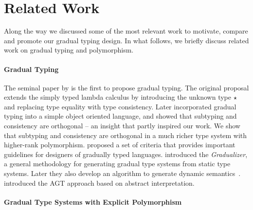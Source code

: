 
\section{Related Work}
\label{sec:related}

Along the way we discussed some of the most relevant work to motivate,
compare and
promote our gradual typing design. In what follows, we briefly discuss related
work on gradual typing and polymorphism.


\paragraph{Gradual Typing}

The seminal paper by \citet{siek2006gradual} is the first to propose gradual
typing.
The original proposal extends the simply typed lambda calculus by
introducing the unknown type $\star$ and replacing type equality with type
consistency.
Later \citet{siek2007gradual} incorporated gradual typing into a
simple object oriented language, and showed that subtyping and consistency are
orthogonal -- an insight that partly inspired our work. We show that subtyping
and consistency are orthogonal in a much richer type system with higher-rank
polymorphism.
\citet{siek2015refined}
proposed a set of criteria that provides important guidelines for designers
of gradually typed languages. \citet{cimini2016gradualizer} introduced the
\textit{Gradualizer}, a general methodology for generating gradual
type systems from static type systems. Later they also develop an algorithm 
to generate dynamic semantics~\cite{CiminiPOPL}.
\citet{garcia2016abstracting} introduced the AGT approach based on abstract
interpretation.


\paragraph{Gradual Type Systems with Explicit Polymorphism}

